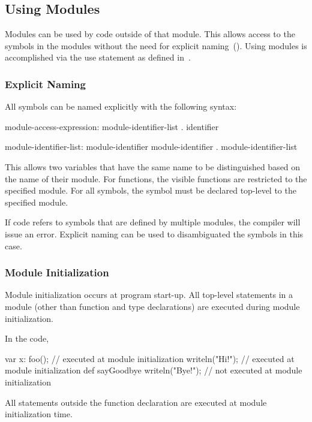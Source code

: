 \subsection{Using Modules}
\label{Using_Modules}

Modules can be used by code outside of that module.  This allows
access to the symbols in the modules without the need for explicit
naming~().  Using modules is accomplished via
the use statement as defined in~.

\subsubsection{Explicit Naming}
\label{Explicit_Naming}

All symbols can be named explicitly with the following syntax:
\begin{syntax}
module-access-expression:
  module-identifier-list . identifier

module-identifier-list:
  module-identifier
  module-identifier . module-identifier-list

\end{syntax}
This allows two variables that have the same name to be distinguished
based on the name of their module.  For functions, the visible
functions are restricted to the specified module.  For all symbols,
the symbol must be declared top-level to the specified module.

If code refers to symbols that are defined by multiple modules, the
compiler will issue an error.  Explicit naming can be used to
disambiguated the symbols in this case.



\subsubsection{Module Initialization}
\label{Module_Initialization}

Module initialization occurs at program start-up.  All top-level
statements in a module (other than function and type declarations) are
executed during module initialization.

\begin{example}
In the code,
\begin{chapel}
var x: foo();        // executed at module initialization
writeln("Hi!");      // executed at module initialization
def sayGoodbye {
  writeln("Bye!");   // not executed at module initialization
}
\end{chapel}
All statements outside the function declaration are executed at module
initialization time.
\end{example}

